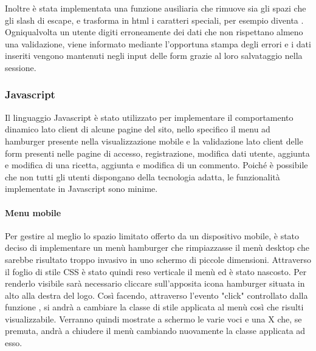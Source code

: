 Inoltre è stata implementata una funzione ausiliaria  che rimuove sia gli spazi che gli slash di escape, e trasforma in html i caratteri speciali, per esempio  diventa .
Ogniqualvolta un utente digiti erroneamente dei dati che non rispettano almeno una validazione, viene informato mediante l'opportuna stampa degli errori e i dati inseriti vengono mantenuti negli input delle form grazie al loro salvataggio nella sessione.

\subsubsection{Javascript}\label{subs:javascript}
Il linguaggio Javascript è stato utilizzato per implementare il comportamento dinamico lato client di alcune pagine del sito, nello specifico il menu ad hamburger presente nella visualizzazione mobile e la validazione lato client delle form presenti nelle pagine di accesso, registrazione, modifica dati utente, aggiunta e modifica di una ricetta, aggiunta e modifica di un commento.
Poiché è possibile che non tutti gli utenti dispongano della tecnologia adatta, le funzionalità implementate in Javascript sono minime.
\paragraph{Menu mobile}\label{par:menu_mobile}
Per gestire al meglio lo spazio limitato offerto da un dispositivo mobile, è stato deciso di implementare un menù hamburger che rimpiazzasse il menù desktop che sarebbe risultato troppo invasivo in uno schermo di piccole dimensioni.
Attraverso il foglio di stile CSS è stato quindi reso verticale il menù ed è stato nascosto. Per renderlo visibile sarà necessario cliccare sull'apposita icona hamburger situata in alto alla destra del logo. Così facendo, attraverso l'evento "click" controllato dalla funzione , si andrà a cambiare la classe di stile applicata al menù così che risulti visualizzabile. Verranno quindi mostrate a schermo le varie voci e una X che, se premuta, andrà a chiudere il menù cambiando nuovamente la classe applicata ad esso.

